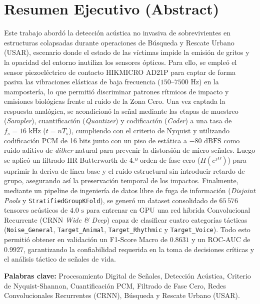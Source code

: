 \documentclass[11pt, a4paper]{article}
\begin{document}
\section*{Resumen Ejecutivo (Abstract)}
Este trabajo abordó la detección acústica no invasiva de sobrevivientes en estructuras colapsadas durante operaciones de Búsqueda y Rescate Urbano (USAR), escenario donde el estado de las víctimas impide la emisión de gritos y la opacidad del entorno inutiliza los sensores ópticos. Para ello, se empleó el sensor piezoeléctrico de contacto HIKMICRO AD21P para captar de forma pasiva las vibraciones elásticas de baja frecuencia ($150\text{--}7500\text{ Hz}$) en la mampostería, lo que permitió discriminar patrones rítmicos de impacto y emisiones biológicas frente al ruido de la Zona Cero. Una vez captada la respuesta analógica, se acondicionó la señal mediante las etapas de muestreo (\textit{Sampler}), cuantificación (\textit{Quantizer}) y codificación (\textit{Coder}) a una tasa de $f_s = 16\text{ kHz}$ ($t = nT_s$), cumpliendo con el criterio de Nyquist y utilizando codificación PCM de 16 bits junto con un piso de estática a $-80\text{ dBFS}$ como ruido aditivo de \textit{dither} natural para prevenir la distorsión de micro-señales. Luego se aplicó un filtrado IIR Butterworth de 4.º orden de fase cero ($H(e^{j\Omega})$) para suprimir la deriva de línea base y el ruido estructural sin introducir retardo de grupo, asegurando así la preservación temporal de los impactos. Finalmente, mediante un pipeline de ingeniería de datos libre de fuga de información (\textit{Disjoint Pools} y \texttt{StratifiedGroupKFold}), se generó un dataset consolidado de $65\,576$ tensores acústicos de $4.0\text{ s}$ para entrenar en GPU una red híbrida Convolucional Recurrente (CRNN \textit{Wide \& Deep}) capaz de clasificar cuatro categorías tácticas (\texttt{Noise\_General}, \texttt{Target\_Animal}, \texttt{Target\_Rhythmic} y \texttt{Target\_Voice}). Todo esto permitió obtener en validación un F1-Score Macro de $0.8631$ y un ROC-AUC de $0.9927$, garantizando la confiabilidad requerida en la toma de decisiones críticas y el análisis táctico de señales de vida.

\textbf{Palabras clave:} Procesamiento Digital de Señales, Detección Acústica, Criterio de Nyquist-Shannon, Cuantificación PCM, Filtrado de Fase Cero, Redes Convolucionales Recurrentes (CRNN), Búsqueda y Rescate Urbano (USAR).

\vspace{0.4cm}

\end{document}
